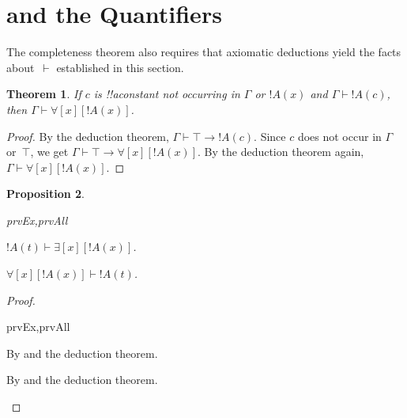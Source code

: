 \documentclass[10pt,a4paper]{article}
\makeatletter
\theoremstyle{plain}
\newtheorem{thm}{Theorem}[section]
\newtheorem{prop}[thm]{Proposition}
\theoremstyle{definition}
\theoremstyle{remark}
\newenvironment{explain}{}{}
\newcommand*{\olfileid}[3]{}
\newcommand*{\olsection}[1]{\section*{#1}}
\newcommand*{\ollabel}[1]{\label{#1}}
\newcommand{\olref}{\@ifnextchar[{\olref@i}{\olref@final}}
\def\olref@i[#1]{\@ifnextchar[{\olref@ii}{\olref@final}}
\def\olref@ii[#1]{\@ifnextchar[{\olref@iii}{\olref@final}}
\def\olref@iii[#1]{\olref@final}
\def\olref@final#1{\ref{#1}}
\providecommand{\lif}{\mathbin{\rightarrow}}
\providecommand{\lforall}{\mathord{\forall}}
\providecommand{\lexists}{\mathord{\exists}}
\providecommand{\ltrue}{\top}
\providecommand{\Proves}{\mathrel{\vdash}}
\providecommand{\tagitem}[1]{\item[#1]}
\makeatother
\begin{document}




\olfileid{fol}{axd}{qpr}

\olsection{ and the Quantifiers}

\begin{explain}
  The completeness theorem also requires that axiomatic deductions
  yield the facts about~$\Proves$ established in this section.
\end{explain}

\begin{thm}
\ollabel{thm:strong-generalization} If $c$ is !!a{constant} not occurring
in $\Gamma$ or $!A(x)$ and $\Gamma \Proves !A(c)$, then $\Gamma
\Proves \lforall[x][!A(x)]$.
\end{thm}

\begin{proof}
By the deduction theorem, $\Gamma \Proves \ltrue \lif !A(c)$. Since
$c$ does not occur in $\Gamma$ or~$\top$, we get $\Gamma \Proves
\ltrue \lif \lforall[x][!A(x)]$. By the deduction theorem again, $\Gamma \Proves
\lforall[x][!A(x)]$.
\end{proof}

\begin{prop}
\ollabel{prop:provability-quantifiers}
\begin{tagenumerate}{prvEx,prvAll}
\tagitem{prvEx}{$!A(t) \Proves \lexists[x][!A(x)]$.}{}

\tagitem{prvAll}{$\lforall[x][!A(x)] \Proves !A(t)$.}{}
\end{tagenumerate}
\end{prop}

\begin{proof}
\begin{tagenumerate}{prvEx,prvAll}
\tagitem{prvEx}{By \olref[qua]{ax:q2} and the deduction theorem.}{}
\tagitem{prvAll}{By \olref[qua]{ax:q1} and the deduction theorem.}{}
\end{tagenumerate}
\end{proof}


\end{document}
